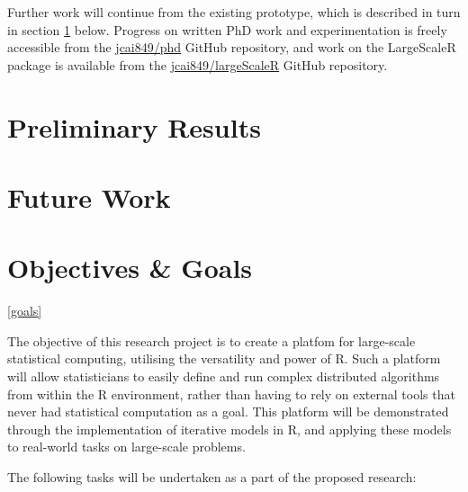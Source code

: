 \documentclass[a4paper,10pt]{article}
\begin{document}
Further work will continue from the existing prototype, which is described in turn in section \ref{curr} below.
Progress on written PhD work and experimentation is freely accessible from the \href{https://github.com/jcai849/phd}{jcai849/phd} GitHub repository, and work on the LargeScaleR package is available from the \href{https://github.com/jcai849/phd}{jcai849/largeScaleR} GitHub repository. 

\section{Preliminary Results}\label{curr}



\section{Future Work}\label{future}


\section{Objectives \& Goals}\ref{goals}

The objective of this research project is to create a platfom for large-scale statistical computing, utilising the versatility and power of R.
Such a platform will allow statisticians to easily define and run complex distributed algorithms from within the R environment, rather than having to rely on external tools that never had statistical computation as a goal.
This platform will be demonstrated through the implementation of iterative models in R, and applying these models to real-world tasks on large-scale problems.

The following tasks will be undertaken as a part of the proposed research:
\end{document}
